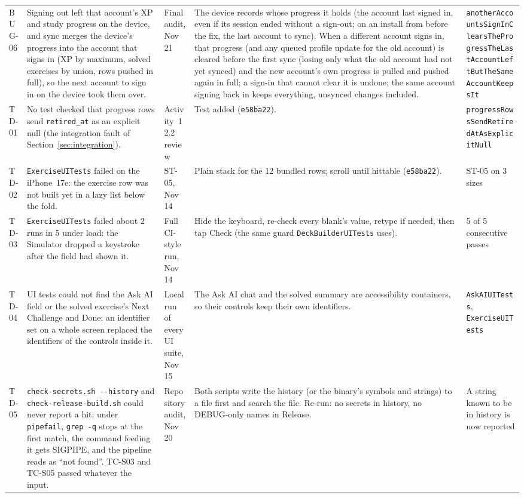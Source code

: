 \documentclass[12pt,letterpaper]{article}
\begin{document}
\begin{xltabular}{\textwidth}{@{}L{1.1cm} Y L{2.4cm} Y L{2.2cm}@{}}
BUG-06 & Signing out left that account's XP and study progress on the device, and sync merges the device's progress into the account that signs in (XP by maximum, solved exercises by union, rows pushed in full), so the next account to sign in on the device took them over. & Final audit, Nov 21 & The device records whose progress it holds (the account last signed in, even if its session ended without a sign-out; on an install from before the fix, the last account to sync). When a different account signs in, that progress (and any queued profile update for the old account) is cleared before the first sync (losing only what the old account had not yet synced) and the new account's own progress is pulled and pushed again in full; a sign-in that cannot clear it is undone; the same account signing back in keeps everything, unsynced changes included. & \texttt{anotherAccountsSignInClears\-TheProgressTheLastAccountLeft\-ButTheSameAccountKeepsIt} \\
TD-01 & No test checked that progress rows send \texttt{retired\_at} as an explicit null (the integration fault of Section~\ref{sec:integration}). & Activity~12.2 review & Test added (\texttt{e58ba22}). & \texttt{progressRowsSendRetiredAtAsExplicitNull} \\
TD-02 & \texttt{ExerciseUITests} failed on the iPhone~17e: the exercise row was not built yet in a lazy list below the fold. & ST-05, Nov 14 & Plain stack for the 12 bundled rows; scroll until hittable (\texttt{e58ba22}). & ST-05 on 3 sizes \\
TD-03 & \texttt{ExerciseUITests} failed about 2 runs in 5 under load: the Simulator dropped a keystroke after the field had shown it. & Full CI-style run, Nov 14 & Hide the keyboard, re-check every blank's value, retype if needed, then tap Check (the same guard \texttt{DeckBuilderUITests} uses). & 5 of 5 consecutive passes \\
TD-04 & UI tests could not find the Ask AI field or the solved exercise's Next Challenge and Done: an identifier set on a whole screen replaced the identifiers of the controls inside it. & Local run of every UI suite, Nov 15 & The Ask AI chat and the solved summary are accessibility containers, so their controls keep their own identifiers. & \texttt{AskAIUITests}, \texttt{ExerciseUITests} \\
TD-05 & \texttt{check-secrets.sh -{}-history} and \texttt{check-release-build.sh} could never report a hit: under \texttt{pipefail}, \texttt{grep -q} stops at the first match, the command feeding it gets SIGPIPE, and the pipeline reads as ``not found''. TC-S03 and TC-S05 passed whatever the input. & Repository audit, Nov 20 & Both scripts write the history (or the binary's symbols and strings) to a file first and search the file. Re-run: no secrets in history, no DEBUG-only names in Release. & A string known to be in history is now reported \\

\end{xltabular}
\end{document}
